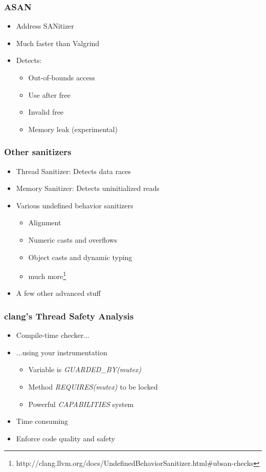 \begin{frame}
  \frametitle{ASAN}

  \begin{itemize}
  \item Address SANitizer
  \item Much faster than Valgrind
  \item Detects:
    \begin{itemize}
    \item Out-of-bounds access
    \item Use after free
    \item Invalid free
    \item Memory leak (experimental)
    \end{itemize}
  \end{itemize}
\end{frame}

\begin{frame}
  \frametitle{Other sanitizers}

  \begin{itemize}
  \item Thread Sanitizer: Detects data races
  \item Memory Sanitizer: Detects uninitialized reads
  \item Various undefined behavior sanitizers
    \begin{itemize}
    \item Alignment
    \item Numeric casts and overflows
    \item Object casts and dynamic typing
    \item much more\footnote{http://clang.llvm.org/docs/UndefinedBehaviorSanitizer.html\#ubsan-checks}
    \end{itemize}
  \item A few other advanced stuff
  \end{itemize}
\end{frame}

\begin{frame}
  \frametitle{clang's Thread Safety Analysis}

  \begin{itemize}
  \item Compile-time checker...
  \item ...using your instrumentation
    \begin{itemize}
    \item Variable is \emph{GUARDED\_BY(mutex)}
    \item Method \emph{REQUIRES(mutex)} to be locked
    \item Powerful \emph{CAPABILITIES} system
    \end{itemize}
  \item Time consuming
  \item Enforce code quality and safety
  \end{itemize}
\end{frame}

